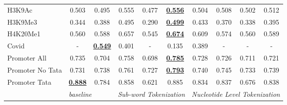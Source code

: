 \begin{table*}[h!]
\begin{center}
\begin{tabular}{l|cc|ccc|cccc}
H3K9Ac & 0.503 & 0.495 & 0.555 & 0.477 & {\ul \textbf{0.556}} & 0.504 & 0.508 & 0.502 & 0.512 \\
H3K9Me3 & 0.344 & 0.388 & 0.495 & 0.290 & {\ul \textbf{0.499}} & 0.433 & 0.370 & 0.338 & 0.395 \\
H4K20Me1 & 0.560 & 0.588 & 0.657 & 0.545 & {\ul \textbf{0.674}} & 0.609 & 0.574 & 0.560 & 0.589 \\
Covid & - & {\ul \textbf{0.549}} & 0.401 & - & 0.135 & 0.389 & - & - & - \\
Promoter All & 0.735 & 0.704 & 0.758 & 0.698 & {\ul \textbf{0.785}} & 0.728 & 0.726 & 0.711 & 0.721 \\
Promoter No Tata & 0.731 & 0.738 & 0.761 & 0.727 & {\ul \textbf{0.793}} & 0.740 & 0.745 & 0.733 & 0.739 \\
Promoter Tata & {\ul \textbf{0.888}} & 0.784 & 0.858 & 0.621 & 0.885 & 0.834 & 0.837 & 0.676 & 0.838 \\
\hline
 & \multicolumn{2}{l|}{\textit{baseline}} & \multicolumn{3}{c|}{\textit{Sub-word Tokenization}} & \multicolumn{4}{c}{\textit{Nucleotide Level Tokenization}} \\ \hline
\end{tabular}
\end{center}
\end{table*}